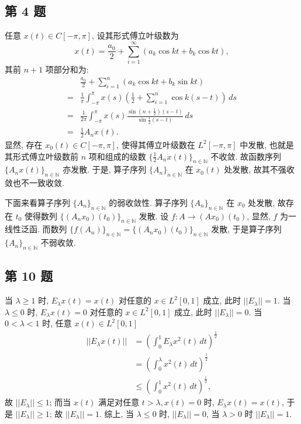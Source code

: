 \documentclass[../main.tex]{subfiles}
\begin{document}
\subsection{第 4 题}
任意 $x(t) \in C[-\pi, \pi]$, 设其形式傅立叶级数为
\[
    x(t) = \frac{a_0}{2} + \sum_{i = 1}^{\infty}(a_k \cos{kt} + b_k \cos{kt}),
\]
其前 $n + 1$ 项部分和为:
\begin{align*}
     & \frac{a_0}{2} + \sum_{i = 1}^{n}(a_k \cos kt + b_k \sin kt) \\
    =& \frac{1}{\pi} \int_{-\pi}^{\pi} x(s)(\frac{1}{2} + \sum_{i = 1}^{n} \cos k(s - t)) \, ds \\
    =& \frac{1}{2 \pi} \int_{-\pi}^{\pi} x(s) \frac{\sin (n + \frac{1}{2})(s - t)}{\sin \frac{1}{2}(s - t)} \, ds \\
    =& \frac{1}{2} A_n x(t).
\end{align*}
显然, 存在 $x_0(t) \in C[-\pi, \pi]$,
使得其傅立叶级数在 $L^2 [-\pi, \pi]$ 中发散,
也就是其形式傅立叶级数前 $n$ 项和组成的级数 $\{ \frac{1}{2} A_n x(t) \}_{n \in \mathbb{N}}$ 不收敛.
故函数序列 $\{ A_n x(t) \}_{n \in \mathbb{N}}$ 亦发散.
于是, 算子序列 $\{ A_n \}_{n \in \mathbb{N}}$ 在 $x_0(t)$ 处发散,
故其不强收敛也不一致收敛.

下面来看算子序列 $\{ A_n \}_{n \in \mathbb{N}}$ 的弱收敛性.
算子序列 $\{ A_n \}_{n \in \mathbb{N}}$ 在 $x_0$ 处发散,
故存在 $t_0$ 使得数列 $\{ (A_n x_0)(t_0) \}_{n \in \mathbb{N}}$ 发散.
设 $f: A \to (A x_0)(t_0)$, 显然, $f$ 为一线性泛函.
而数列 $\{ f(A_n) \}_{n \in \mathbb{N}} = \{ (A_n x_0)(t_0) \}_{n \in \mathbb{N}}$ 发散,
于是算子序列 $\{ A_n \}_{n \in \mathbb{N}}$ 不弱收敛.

\subsection{第 10 题}
当 $\lambda \geqslant 1$ 时, $E_{\lambda} x(t) = x(t)$ 对任意的 $x \in L^2[0, 1]$ 成立, 此时 $|| E_{\lambda} || = 1$.
当 $\lambda \leqslant 0$ 时, $E_{\lambda} x(t) = 0$ 对任意的 $x \in L^2[0, 1]$ 成立, 此时 $|| E_{\lambda} || = 0$. 
当 $ 0 < \lambda < 1$ 时, 任意 $x(t) \in L^2[0, 1]$
\begin{align*}
    || E_{\lambda} x(t) || &= (\int_0^1 E_{\lambda} x^2(t) \, dt)^{\frac{1}{2}} \\
                           &= (\int_0^{\lambda} x^2(t) \, dt)^{\frac{1}{2}} \\
                           &\leqslant (\int_0^1 x^2(t) \, dt)^{\frac{1}{2}},
\end{align*}
故 $|| E_{\lambda} || \leqslant 1$;
而当 $x(t)$ 满足对任意 $t > \lambda, x(t) = 0$ 时, $E_{\lambda} x(t) = x(t)$, 于是 $|| E_{\lambda} || \geqslant 1$;
故 $|| E_{\lambda} || = 1$.
综上, 当 $\lambda \leqslant 0$ 时, $|| E_{\lambda} || = 0$, 当 $\lambda > 0$ 时 $|| E_{\lambda} || = 1$.
\end{document}
